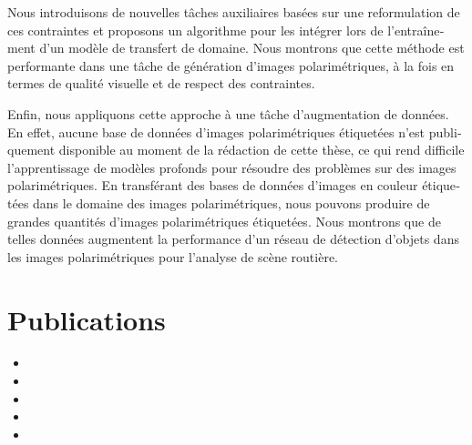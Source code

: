 \begin{otherlanguage}{french}
Nous introduisons de nouvelles tâches auxiliaires basées sur une reformulation de ces contraintes et proposons un algorithme pour les intégrer lors de l'entraînement d'un modèle de transfert de domaine. Nous montrons que cette méthode est performante dans une tâche de génération d'images polarimétriques, à la fois en termes de qualité visuelle et de respect des contraintes.

Enfin, nous appliquons cette approche à une tâche d'augmentation de données. En effet, aucune base de données d'images polarimétriques étiquetées n'est publiquement disponible au moment de la rédaction de cette thèse, ce qui rend difficile l'apprentissage de modèles profonds pour résoudre des problèmes sur des images polarimétriques. En transférant des bases de données d'images en couleur étiquetées dans le domaine des images polarimétriques, nous pouvons produire de grandes quantités d'images polarimétriques étiquetées. Nous montrons que de telles données augmentent la performance d'un réseau de détection d'objets dans les images polarimétriques pour l'analyse de scène routière.

\section*{Publications}

\end{otherlanguage}

\begin{itemize}
	\item{}
	\item{}
	\item{}
	\item{}
	\item{}
\end{itemize}


\fancyhead[R]{}